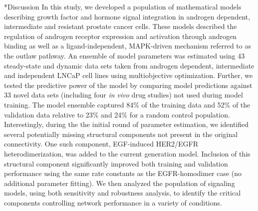 \documentclass[12pt]{article}
\makeatletter
\renewcommand\section{\@startsection
	{subsection}{2}{0mm}
	{-0.2in}
	{0.05\baselineskip}
	{\normalfont\large\bfseries}}
\makeatother
\begin{document}
\section*{Discussion}
In this study, we developed a population of mathematical models describing growth factor and hormone signal integration in androgen dependent, intermediate and resistant prostate cancer cells. 
These models described the regulation of androgen receptor expression and activation through androgen binding as well as a ligand-independent, MAPK-driven mechanism referred to as the outlaw pathway. 
An ensemble of model parameters was estimated using 43 steady-state and dynamic data sets taken from androgen dependent, intermediate and independent LNCaP cell lines using multiobjective optimization. 
Further, we tested the predictive power of the model by comparing model predictions against 33 novel data sets (including four \textit{in vivo} drug studies) not used during model training. 
The model ensemble captured 84\% of the training data and 52\% of the validation data relative to 23\% and 24\% for a random control population. 
Interestingly, during the the initial round of parameter estimation, we identified several potentially missing structural components not present in the original connectivity. 
One such component, EGF-induced HER2/EGFR heterodimerization, was added to the current generation model. 
Inclusion of this structural component significantly improved both training and validation performance using the same rate constants as the EGFR-homodimer case (no additional parameter fitting). 
We then analyzed the population of signaling models, using both sensitivity and robustness analysis, to identify the critical components controlling network performance in a variety of conditions. 

\end{document}
